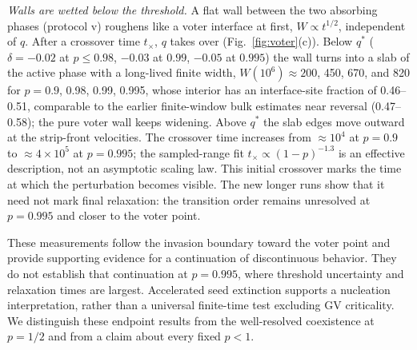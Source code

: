 \documentclass[pre,twocolumn,superscriptaddress,showpacs,floatfix]{revtex4-2}
\newcommand{\qs}{q^{*}}
\begin{document}
\textit{Walls are wetted below the threshold.} A flat wall between the two absorbing phases
(protocol v) roughens like a voter interface at first, $W\propto t^{1/2}$, independent of $q$. After
a crossover time $t_\times$, $q$ takes over (Fig.~\ref{fig:voter}(c)). Below $\qs$ ($\delta =
-0.02$ at $p\le 0.98$, $-0.03$ at $0.99$, $-0.05$ at $0.995$) the wall turns into a slab of the
active phase with a long-lived finite width, $W(10^6)\approx 200$,
450, 670, and 820 for $p = 0.9$, 0.98, 0.99, 0.995, whose interior has an interface-site
fraction of 0.46--0.51, comparable to the earlier finite-window bulk estimates
near reversal (0.47--0.58); the pure voter wall
keeps widening. Above
$\qs$ the slab edges move outward at the strip-front velocities.
The crossover time increases from $\approx10^4$ at $p=0.9$ to
$\approx4\times10^5$ at $p=0.995$; the sampled-range fit
$t_\times\propto(1-p)^{-1.3}$ is an effective description, not an
asymptotic scaling law. This initial crossover marks the time at which
the perturbation becomes visible. The new longer runs show that it need
not mark final relaxation: the transition order remains unresolved at
$p=0.995$ and closer to the voter point.

These measurements follow the invasion boundary toward the voter point
and provide supporting evidence for a continuation of discontinuous behavior.
They do not establish that continuation at $p=0.995$, where threshold
uncertainty and relaxation times are largest. Accelerated seed extinction
supports a nucleation interpretation, rather than a universal finite-time
test excluding GV criticality. We distinguish these endpoint results from
the well-resolved coexistence at $p=1/2$ and from a claim about every fixed
$p<1$.
\end{document}
